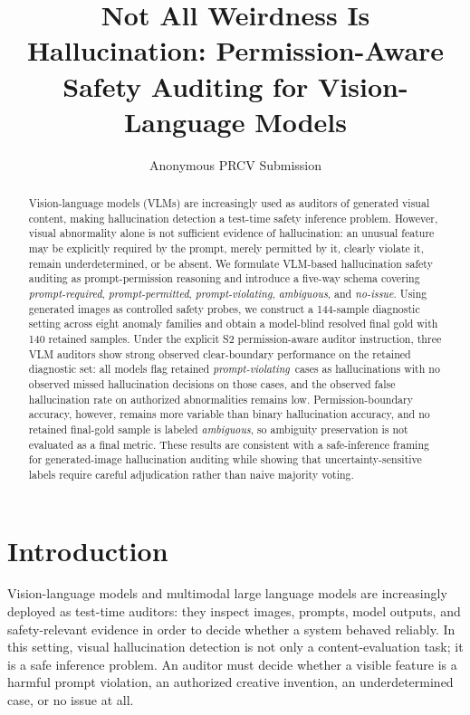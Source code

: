 \documentclass[runningheads]{llncs}
\title{Not All Weirdness Is Hallucination: Permission-Aware Safety Auditing for Vision-Language Models}
\author{Anonymous PRCV Submission}
\institute{}
\newcommand{\permrequired}{\emph{prompt-required}}
\newcommand{\permpermitted}{\emph{prompt-permitted}}
\newcommand{\permviolating}{\emph{prompt-violating}}
\newcommand{\permambiguous}{\emph{ambiguous}}
\newcommand{\permnoissue}{\emph{no-issue}}
\begin{document}
\maketitle

\begin{abstract}
Vision-language models (VLMs) are increasingly used as auditors of generated visual content, making hallucination detection a test-time safety inference problem. However, visual abnormality alone is not sufficient evidence of hallucination: an unusual feature may be explicitly required by the prompt, merely permitted by it, clearly violate it, remain underdetermined, or be absent. We formulate VLM-based hallucination safety auditing as prompt-permission reasoning and introduce a five-way schema covering \permrequired, \permpermitted, \permviolating, \permambiguous, and \permnoissue. Using generated images as controlled safety probes, we construct a 144-sample diagnostic setting across eight anomaly families and obtain a model-blind resolved final gold with 140 retained samples. Under the explicit S2 permission-aware auditor instruction, three VLM auditors show strong observed clear-boundary performance on the retained diagnostic set: all models flag retained \permviolating\ cases as hallucinations with no observed missed hallucination decisions on those cases, and the observed false hallucination rate on authorized abnormalities remains low. Permission-boundary accuracy, however, remains more variable than binary hallucination accuracy, and no retained final-gold sample is labeled \permambiguous, so ambiguity preservation is not evaluated as a final metric. These results are consistent with a safe-inference framing for generated-image hallucination auditing while showing that uncertainty-sensitive labels require careful adjudication rather than naive majority voting.
\end{abstract}

\section{Introduction}

Vision-language models and multimodal large language models are increasingly deployed as test-time auditors: they inspect images, prompts, model outputs, and safety-relevant evidence in order to decide whether a system behaved reliably. In this setting, visual hallucination detection is not only a content-evaluation task; it is a safe inference problem. An auditor must decide whether a visible feature is a harmful prompt violation, an authorized creative invention, an underdetermined case, or no issue at all.
\end{document}
